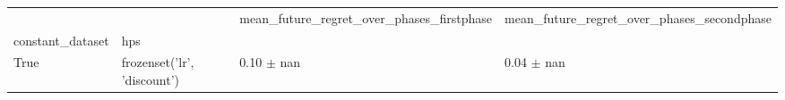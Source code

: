 \begin{tabular}{llll}
\toprule
 &  & mean_future_regret_over_phases_firstphase & mean_future_regret_over_phases_secondphase \\
constant_dataset & hps &  &  \\
\midrule
True & frozenset({'lr', 'discount'}) & 0.10 $\pm$ nan & 0.04 $\pm$ nan \\
\cline{1-4}
\bottomrule
\end{tabular}
